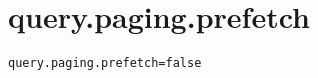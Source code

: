 \section{query.paging.prefetch}
\label{configuration:QueryPagingPrefetch}
\ClearAPI
\TODO
{}
\begin{lstlisting}[style=Props,caption={Usage example for \textit{query.paging.prefetch}}]
query.paging.prefetch=false
\end{lstlisting}